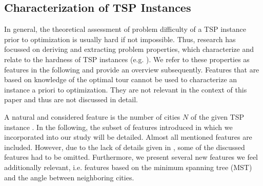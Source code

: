 \documentclass{article}
\begin{document}
\subsection{Characterization of TSP Instances}\label{subsec:feat}

In general, the theoretical assessment of problem difficulty of a TSP
instance prior to optimization is usually hard if not
impossible. Thus, research has focussed on deriving and extracting
problem properties, which characterize and relate to the hardness of
TSP instances (e.g. \cite{SMHL10,KCHS11,SH11,KM12}). We refer to these
properties as features in the following and provide an overview
subsequently. Features that are based on knowledge of the optimal tour
\cite{SS92,KSW05} cannot be used to characterize an instance a priori
to optimization. They are not relevant in the context of this paper
and thus are not discussed in detail.

A natural and considered feature is the number of cities $N$ of the
given TSP instance \cite{SMHL10,KCHS11,SH11,KM12}. In the following,
the subset of features introduced in \cite{SMHL10,KCHS11,SH11,KM12} which we
incorporated into our study will be detailed. Almost all mentioned
features are included. However, due to the lack of details given in
\cite{KM12}, some of the discussed features had to be omitted.
Furthermore, we present several new features we feel additionally
relevant, i.e. features based on the minimum spanning tree (MST) and
the angle between neighboring cities.
\end{document}
